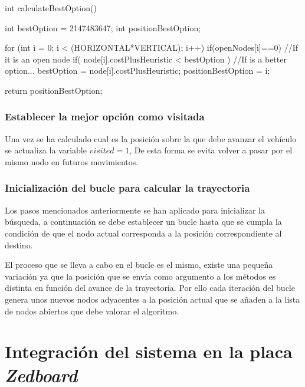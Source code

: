 \begin{listing}[
  float=ht,
  language = C++,
  caption  = {Función con la que se calcula el mejor nodo},
  label    = code:BestOption]
int calculateBestOption(){
	int bestOption = 2147483647;
	int positionBestOption;

	for (int i = 0; i < (HORIZONTAL*VERTICAL); i++) {
		if(openNodes[i]==0){ //If it is an open node
			if( node[i].costPlusHeuristic < bestOption ){ //If is a better option...
				bestOption = node[i].costPlusHeuristic;
				positionBestOption = i;
			}
		}
	}

	return positionBestOption;
}
\end{listing}

\subsubsection{Establecer la mejor opción como visitada}\label{subsec:NodoVisitado}

Una vez se ha calculado cual es la posición sobre la que debe avanzar el vehículo se actualiza la variable $visited=1$, De esta forma se evita volver a pasar por el mismo nodo en futuros movimientos.

\subsubsection{Inicialización del bucle para calcular la trayectoria}\label{subsec:BucleA}   

Los pasos mencionados anteriormente se han aplicado para inicializar la búsqueda, a continuación se debe establecer un bucle hasta que se cumpla la condición de que el nodo actual corresponda a la posición correspondiente al destino. 

El proceso que se lleva a cabo en el bucle es el mismo, existe una pequeña variación ya que la posición que se envía como argumento a los métodos es distinta en función del avance de la trayectoria. Por ello cada iteración del bucle genera unos nuevos nodos adyacentes a la posición actual que se añaden a la lista de nodos abiertos que debe valorar el algoritmo. 

\section{Integración del sistema en la placa \emph{Zedboard} }\label{sec:IntegracionZedboard}

